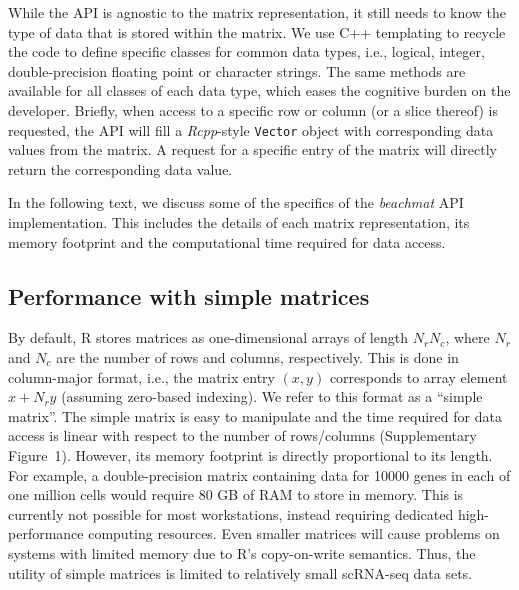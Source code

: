 \documentclass[10pt,letterpaper]{article}
\newcommand{\beachmat}{\textit{beachmat}}
\newcommand{\code}[1]{\texttt{#1}}
\newcommand{\suppfigsimpleaccess}{1}
\begin{document}
While the API is agnostic to the matrix representation, it still needs to know the type of data that is stored within the matrix.
We use C++ templating to recycle the code to define specific classes for common data types, i.e., logical, integer, double-precision floating point or character strings.
The same methods are available for all classes of each data type, which eases the cognitive burden on the developer.
Briefly, when access to a specific row or column (or a slice thereof) is requested, the API will fill a \textit{Rcpp}-style \code{Vector} object with corresponding data values from the matrix.
A request for a specific entry of the matrix will directly return the corresponding data value.

In the following text, we discuss some of the specifics of the \beachmat{} API implementation.
This includes the details of each matrix representation, its memory footprint and the computational time required for data access.

\subsection*{Performance with simple matrices}
By default, R stores matrices as one-dimensional arrays of length $N_rN_c$, where $N_r$ and $N_c$ are the number of rows and columns, respectively.
This is done in column-major format, i.e., the matrix entry $(x, y)$ corresponds to array element $x + N_ry$ (assuming zero-based indexing).
We refer to this format as a ``simple matrix''.
The simple matrix is easy to manipulate and the time required for data access is linear with respect to the number of rows/columns (Supplementary Figure~\suppfigsimpleaccess{}).
However, its memory footprint is directly proportional to its length.
For example, a double-precision matrix containing data for 10000 genes in each of one million cells would require 80 GB of RAM to store in memory.
This is currently not possible for most workstations, instead requiring dedicated high-performance computing resources.
Even smaller matrices will cause problems on systems with limited memory due to R's copy-on-write semantics.
Thus, the utility of simple matrices is limited to relatively small scRNA-seq data sets.

\end{document}
